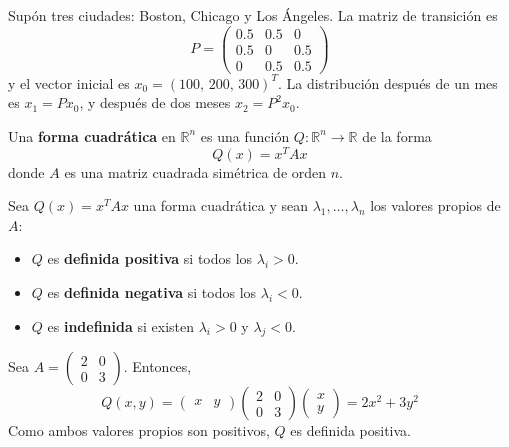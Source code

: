 \begin{example}
Supón tres ciudades: Boston, Chicago y Los Ángeles. La matriz de transición es
\[
P = \begin{pmatrix}
0.5 & 0.5 & 0 \\
0.5 & 0 & 0.5 \\
0 & 0.5 & 0.5
\end{pmatrix}
\]
y el vector inicial es $x_0 = (100,\, 200,\, 300)^T$. La distribución después de un mes es $x_1 = P x_0$, y después de dos meses $x_2 = P^2 x_0$.
\end{example}


\begin{definition}
Una \textbf{forma cuadrática} en $\mathbb{R}^n$ es una función $Q:\mathbb{R}^n \to \mathbb{R}$ de la forma
\[
Q(x) = x^T A x
\]
donde $A$ es una matriz cuadrada simétrica de orden $n$.
\end{definition}

\begin{theorem}
Sea $Q(x) = x^T A x$ una forma cuadrática y sean $\lambda_1, \dots, \lambda_n$ los valores propios de $A$:
\begin{itemize}
    \item $Q$ es \textbf{definida positiva} si todos los $\lambda_i > 0$.
    \item $Q$ es \textbf{definida negativa} si todos los $\lambda_i < 0$.
    \item $Q$ es \textbf{indefinida} si existen $\lambda_i > 0$ y $\lambda_j < 0$.
\end{itemize}
\end{theorem}

\begin{example}
Sea $A = \begin{pmatrix} 2 & 0 \\ 0 & 3 \end{pmatrix}$. Entonces,
\[
Q(x, y) = \begin{pmatrix} x & y \end{pmatrix}
\begin{pmatrix} 2 & 0 \\ 0 & 3 \end{pmatrix}
\begin{pmatrix} x \\ y \end{pmatrix}
= 2x^2 + 3y^2
\]
Como ambos valores propios son positivos, $Q$ es definida positiva.
\end{example}

